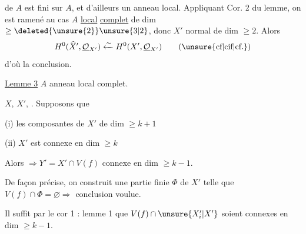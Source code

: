 de $A$ est fini sur $A$, et d'ailleurs un anneau local. Appliquant Cor. 2 du lemme, on est ramené au cas $A$ \uline{local} \uline{complet}  de dim $\geq\deleted{\unsure{2}}\unsure{3|2}$, donc $X'$ normal de dim $\geq 2$. Alors
\[
 H^0(\widehat X',\underline{\mathcal O}_{X'})\xleftarrow{\sim}
 H^0(X',\underline{\mathcal O}_{X'})\qquad(\text{\unsure{cf|cif|cf.}})
\]
d'où la conclusion.

\uline{Lemme 3} \quad $A$ anneau local   complet. 

$X$, $X'$, \deleted{[$Y'=V(f)\cap X'$]}. Supposons  que

(i) les composantes de $X'$ de dim $\geq k+1$

(ii) $X'$ est connexe en dim $\geq k$

Alors   $\Longrightarrow Y'=X'\cap V(f)$   connexe en dim $\geq k-1$.

De façon précise, on construit une partie finie $\Phi$ de $X'$ telle que $V(f)\cap\Phi=\varnothing\Longrightarrow$ conclusion voulue.

Il suffit par le cor 1 : lemme 1 que $V(f)\cap\unsure{X'_i|X'}$ soient connexes en dim $\geq k-1$.

